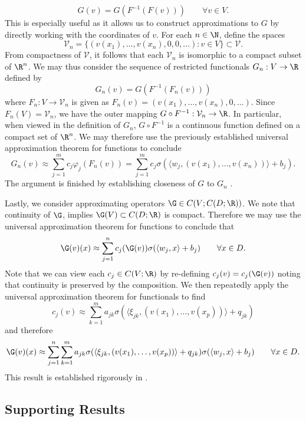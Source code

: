 {\begin{equation}
G(v) = G(F^{-1}(F(v))) \qquad \forall v \in V.
\end{equation}
This is especially useful as it allows us to construct approximations to \(G\)  by directly working 
with the coordinates of \(v\). For each \(n \in \N\), define the spaces
\begin{equation}
\mathcal{V}_n = \{(v(x_1),\dots,v(x_n),0,0,\dots) : v \in V\} \subset \mathcal{V}.
\end{equation}
From compactness of \(\mathcal{V}\), it follows that each \(\mathcal{V}_n\) is isomorphic to a compact subset of \(\R^n\).
We may thus consider the sequence of restricted functionals \(G_n : V \to \R\) defined by
\begin{equation}
G_n(v) = G(F^{-1}(F_n(v)))
\end{equation}
where \(F_n : V \to \mathcal{V}_n\) is given as \(F_n(v) = (v(x_1),\dots,v(x_n),0,\dots)\). Since \(F_n(V) = \mathcal{V}_n\),
we have the outer mapping \(G \circ F^{-1} : \mathcal{V}_n \to \R\). In particular, when viewed in the definition of \(G_n\), 
\(G \circ F^{-1} \) is a continuous function defined on a compact set of \(\R^n\). We may therefore use the
previously established universal approximation theorem for functions to conclude
\[G_n(v) \approx \sum_{j=1}^m c_j \varphi_j (F_n(v)) = \sum_{j=1}^m c_j \sigma (\langle w_j, (v(x_1),\dots,v(x_n)) \rangle + b_j).\]
The argument is finished by establishing closeness of \(G\) to \(G_n\) \cite[Theorem 4]{chen1995universal}.

Lastly, we consider approximating operators \(\G \in C(V; C(D;\R))\). We note that continuity of \(\G\),
implies \(\G(V) \subset C(D;\R)\) is compact. Therefore we may use the universal approximation theorem for functions
to conclude that
\[\G(v)(x) \approx \sum_{j=1}^n c_j(\G(v)) \sigma ( \langle w_j, x \rangle + b_j) \qquad \forall x \in D.\]
Note that we can view each \(c_j \in C(V;\R)\) by re-defining \(c_j(v) = c_j(\G(v))\) noting that continuity is preserved by
the composition.
We then repeatedly apply the universal approximation theorem for functionals to find
\[c_j(v) \approx \sum_{k=1}^m a_{jk} \sigma (\langle \xi_{jk}, (v(x_1),\dots,v(x_p)) \rangle + q_{jk} ) \]
and therefore
\[\G(v)(x) \approx \sum_{j=1}^n \sum_{k=1}^m a_{jk} \sigma (\langle \xi_{jk}, (v(x_1),\dots,v(x_p)) \rangle + q_{jk} )\sigma ( \langle w_j, x \rangle + b_j) \qquad \forall x \in D.\]
This result is established rigorously in \cite[Theorem 5]{chen1995universal}.

\subsection{Supporting Results}

}
